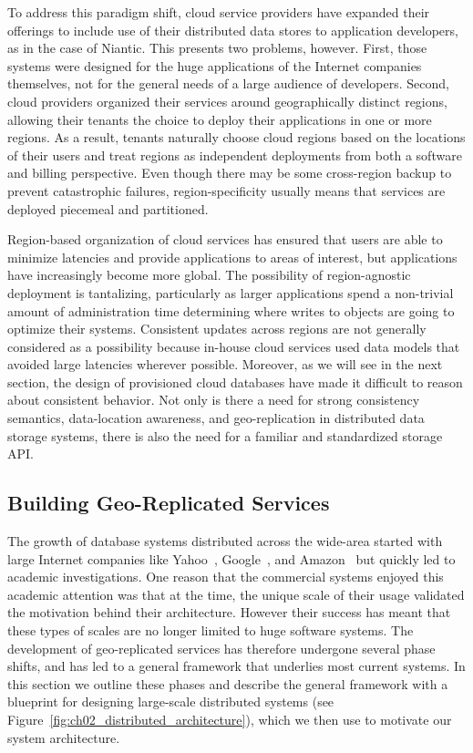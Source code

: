 To address this paradigm shift, cloud service providers have expanded their offerings to include use of their distributed data stores to application developers, as in the case of Niantic.
This presents two problems, however.
First, those systems were designed for the huge applications of the Internet companies themselves, not for the general needs of a large audience of developers.
Second, cloud providers organized their services around geographically distinct regions, allowing their tenants the choice to deploy their applications in one or more regions.
As a result, tenants naturally choose cloud regions based on the locations of their users and treat regions as independent deployments from both a software and billing perspective.
Even though there may be some cross-region backup to prevent catastrophic failures, region-specificity usually means that services are deployed piecemeal and partitioned.

Region-based organization of cloud services has ensured that users are able to minimize latencies and provide applications to areas of interest, but applications have increasingly become more global.
The possibility of region-agnostic deployment is tantalizing, particularly as larger applications spend a non-trivial amount of administration time determining where writes to objects are going to optimize their systems.
Consistent updates across regions are not generally considered as a possibility because in-house cloud services used data models that avoided large latencies wherever possible.
Moreover, as we will see in the next section, the design of provisioned cloud databases have made it difficult to reason about consistent behavior.
Not only is there a need for strong consistency semantics, data-location awareness, and geo-replication in distributed data storage systems, there is also the need for a familiar and standardized storage API.

\subsection{Building Geo-Replicated Services}
\label{ch02_systems_background}

The growth of database systems distributed across the wide-area started with large Internet companies like Yahoo~\cite{pnuts}, Google~\cite{bigtable}, and Amazon~\cite{dynamo} but quickly led to academic investigations.
One reason that the commercial systems enjoyed this academic attention was that at the time, the unique scale of their usage validated the motivation behind their architecture.
However their success has meant that these types of scales are no longer limited to huge software systems.
The development of geo-replicated services has therefore undergone several phase shifts, and has led to a general framework that underlies most current systems.
In this section we outline these phases and describe the general framework with a blueprint for designing large-scale distributed systems (see Figure~\ref{fig:ch02_distributed_architecture}), which we then use to motivate our system architecture.

